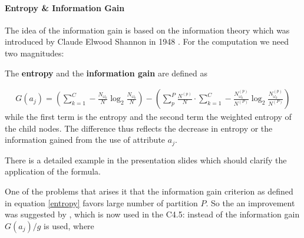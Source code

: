 \paragraph{Entropy \& Information Gain}

The idea of the information gain is based on the information theory which was introduced by Claude Elwood Shannon in 1948 \cite{shannon2001mathematical}. For the computation we need two magnitudes: 


\begin{definition}
The \textbf{entropy} and the \textbf{information gain} are defined as

\begin{align}
    G(a_j) = \left( \sum_{k=1}^C -  \frac{N_{\omega_k}}{N} \log_2 \frac{N_{\omega_k}}{N}  \right) - \left( \sum_{p}^P \frac{N^{(p)}}{N} \cdot \sum_{k=1}^C -  \frac{N^{(p)}_{\omega_k}}{N^{(P)}} \log_2 \frac{N^{(p)}_{\omega_k}}{N^{(P)}} \right) \label{entropy}
\end{align}
while the first term is the entropy and the second term the weighted entropy of the child nodes. The difference thus reflects the decrease in entropy or the information gained from the use of attribute $a_j$.


\end{definition}


\begin{remark}
    There is a detailed example in the presentation slides which should clarify the application of the formula.
\end{remark}


One of the problems that arises it that the information gain criterion as defined in equation \ref{entropy} favors large number of partition $P$. So the an improvement was suggested by \cite{quinlan1993c4}, which is now used in the C4.5: instead of the information gain $G(a_j) / g$ is used, where


